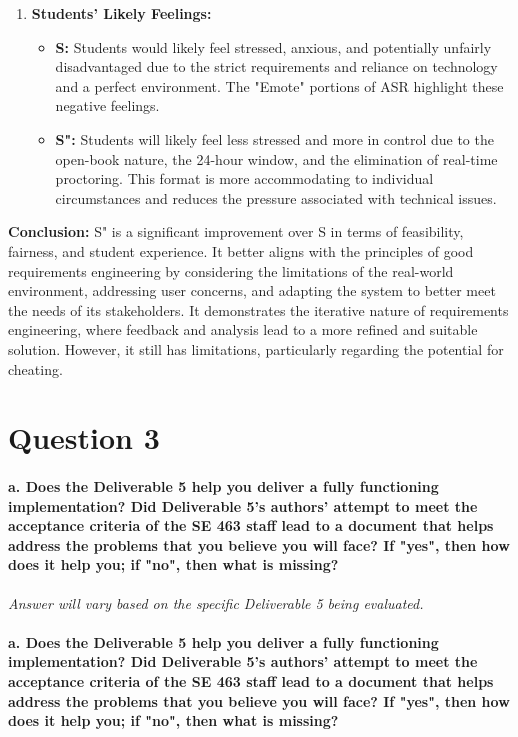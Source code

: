 \documentclass{article}
\begin{document}
\begin{enumerate}
    \item \textbf{Students' Likely Feelings:}
    \begin{itemize}
        \item \textbf{S:} Students would likely feel stressed, anxious, and potentially unfairly disadvantaged due to the strict requirements and reliance on technology and a perfect environment. The "Emote" portions of ASR highlight these negative feelings.
        \item \textbf{S":} Students will likely feel less stressed and more in control due to the open-book nature, the 24-hour window, and the elimination of real-time proctoring. This format is more accommodating to individual circumstances and reduces the pressure associated with technical issues.
    \end{itemize}
\end{enumerate}

\textbf{Conclusion:} S" is a significant improvement over S in terms of feasibility, fairness, and student experience. It better aligns with the principles of good requirements engineering by considering the limitations of the real-world environment, addressing user concerns, and adapting the system to better meet the needs of its stakeholders. It demonstrates the iterative nature of requirements engineering, where feedback and analysis lead to a more refined and suitable solution. However, it still has limitations, particularly regarding the potential for cheating.

\section*{Question 3}

\paragraph{a. Does the Deliverable 5 help you deliver a fully functioning implementation? Did Deliverable 5's authors' attempt to meet the acceptance criteria of the SE 463 staff lead to a document that helps address the problems that you believe you will face? If "yes", then how does it help you; if "no", then what is missing?}

\textit{Answer will vary based on the specific Deliverable 5 being evaluated.}

\paragraph{a. Does the Deliverable 5 help you deliver a fully functioning implementation? Did Deliverable 5's authors' attempt to meet the acceptance criteria of the SE 463 staff lead to a document that helps address the problems that you believe you will face? If "yes", then how does it help you; if "no", then what is missing?}
\end{document}
